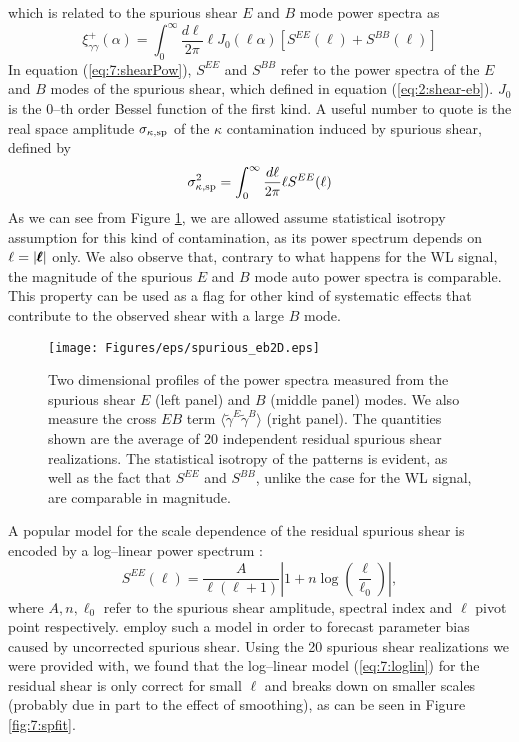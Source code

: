 %
which is related to the spurious shear $E$ and $B$ mode power spectra as 
\begin{equation}
\label{eq:7:shearPow}
\xi_{\gamma\gamma}^+(\alpha) = \int_0^\infty \frac{d\ell}{2\pi}\ell J_0(\ell\alpha)[S^{EE}(\ell)+S^{BB}(\ell)] 
\end{equation}
%
In equation (\ref{eq:7:shearPow}), $S^{EE}$ and $ S^{BB}$ refer to the power spectra of the $E$ and $B$ modes of the spurious shear, which defined in equation (\ref{eq:2:shear-eb}). $J_0$ is the 0--th order Bessel function of the first kind. A useful number to quote is the real space amplitude $\sigma_{\kappa,{\rm sp}}$ of the $\kappa$ contamination induced by spurious shear, defined by
\begin{equation}
\label{eq:7:sigmasys}
\sigma^2_{\kappa,{\rm sp}} = \int_0^\infty \frac{d\ell}{2\pi}\ell S^{EE}(\ell) 
\end{equation}
%
As we can see from Figure \ref{fig:7:eb2d}, we are allowed assume statistical isotropy assumption for this kind of contamination, as its power spectrum depends on $\ell=\vert\pmb{\ell}\vert$ only. We also observe that, contrary to what happens for the WL signal, the magnitude of the spurious $E$ and $B$ mode auto power spectra is comparable. This property can be used as a flag for other kind of systematic effects that contribute to the observed shear with a large $B$ mode. 
%
\begin{figure}
\begin{center}
\texttt{[image: Figures/eps/spurious\_eb2D.eps]}
\end{center}
\caption{Two dimensional profiles of the power spectra measured from the spurious shear $E$ (left panel) and $B$ (middle panel) modes. We also measure the cross $EB$ term $\langle\tilde{\gamma}^E\tilde{\gamma}^B\rangle$ (right panel). The quantities shown are the average of 20 independent residual spurious shear realizations. The statistical isotropy of the patterns is evident, as well as the fact that $S^{EE}$ and $S^{BB}$, unlike the case for the WL signal, are comparable in magnitude.}
\label{fig:7:eb2d}
\end{figure} 
%
A popular model for the scale dependence of the residual spurious shear is encoded by a log--linear power spectrum \citep{AmaraSP}: 
\begin{equation}
\label{eq:7:loglin}
S^{EE}(\ell) = \frac{A}{\ell(\ell+1)}\left\vert1+n\log\left(\frac{\ell}{\ell_0}\right)\right\vert,
\end{equation}
%
where $A,n,\ell_0$ refer to the spurious shear amplitude, spectral index and $\ell$ pivot point respectively. \citep{AmaraSP} employ such a model in order to forecast parameter bias caused by uncorrected spurious shear. Using the 20 spurious shear realizations we were provided with, we found that the log--linear model (\ref{eq:7:loglin}) for the residual shear is only correct for small $\ell$ and breaks down on smaller scales \citep{PetriSpShear} (probably due in part to the effect of smoothing), as can be seen in Figure \ref{fig:7:spfit}. 
